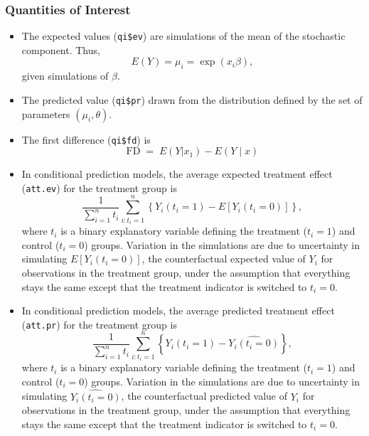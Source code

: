 \documentclass{article}
\begin{document}
\subsubsection{Quantities of Interest}
\begin{itemize}
\item The expected values ({\tt qi\$ev}) are simulations of the mean
  of the stochastic component.  Thus, $$E(Y) = \mu_i = \exp(x_i
  \beta),$$ given simulations of $\beta$.  
  
\item The predicted value ({\tt qi\$pr}) drawn from the distribution
  defined by the set of parameters $(\mu_i, \theta)$.

\item The first difference ({\tt qi\$fd}) is
\begin{equation*}
\textrm{FD} \; = \; E(Y | x_1) - E(Y \mid x)
\end{equation*}
\item In conditional prediction models, the average expected treatment
  effect ({\tt att.ev}) for the treatment group is 
    \begin{equation*} \frac{1}{\sum_{i=1}^n t_i}\sum_{i:t_i=1}^n \left\{ Y_i(t_i=1) -
      E[Y_i(t_i=0)] \right\},
    \end{equation*} 
    where $t_i$ is a binary explanatory variable defining the treatment
    ($t_i=1$) and control ($t_i=0$) groups.  Variation in the
    simulations are due to uncertainty in simulating $E[Y_i(t_i=0)]$,
    the counterfactual expected value of $Y_i$ for observations in the
    treatment group, under the assumption that everything stays the
    same except that the treatment indicator is switched to $t_i=0$.

\item In conditional prediction models, the average predicted treatment
  effect ({\tt att.pr}) for the treatment group is 
    \begin{equation*} \frac{1}{\sum_{i=1}^n t_i}\sum_{i:t_i=1}^n \left\{ Y_i(t_i=1) -
      \widehat{Y_i(t_i=0)} \right\},
    \end{equation*} 
    where $t_i$ is a binary explanatory variable defining the
    treatment ($t_i=1$) and control ($t_i=0$) groups.  Variation in
    the simulations are due to uncertainty in simulating
    $\widehat{Y_i(t_i=0)}$, the counterfactual predicted value of
    $Y_i$ for observations in the treatment group, under the
    assumption that everything stays the same except that the
    treatment indicator is switched to $t_i=0$.
\end{itemize}
\end{document}
